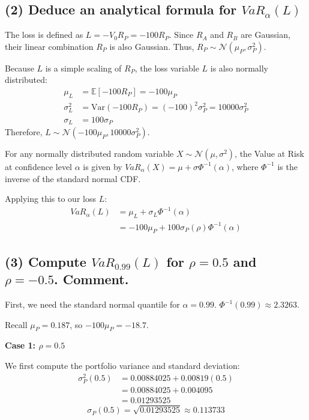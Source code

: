 \subsection*{(2) Deduce an analytical formula for $VaR_{\alpha}(L)$}

The loss is defined as $L = -V_0 R_P = -100 R_P$.
Since $R_A$ and $R_B$ are Gaussian, their linear combination $R_P$ is also Gaussian. Thus, $R_P \sim \mathcal{N}(\mu_P, \sigma_P^2)$.

Because $L$ is a simple scaling of $R_P$, the loss variable $L$ is also normally distributed:
\begin{align*}
\mu_L &= \mathbb{E}[-100 R_P] = -100 \mu_P \\
\sigma_L^2 &= \text{Var}(-100 R_P) = (-100)^2 \sigma_P^2 = 10000 \sigma_P^2 \\
\sigma_L &= 100 \sigma_P
\end{align*}
Therefore, $L \sim \mathcal{N}(-100\mu_P, 10000\sigma_P^2)$.

For any normally distributed random variable $X \sim \mathcal{N}(\mu, \sigma^2)$, the Value at Risk at confidence level $\alpha$ is given by $VaR_{\alpha}(X) = \mu + \sigma \Phi^{-1}(\alpha)$, where $\Phi^{-1}$ is the inverse of the standard normal CDF.

Applying this to our loss $L$:
\begin{align*}
VaR_{\alpha}(L) &= \mu_L + \sigma_L \Phi^{-1}(\alpha) \\
&= -100\mu_P + 100\sigma_P(\rho) \Phi^{-1}(\alpha)
\end{align*}


\subsection*{(3) Compute $VaR_{0.99}(L)$ for $\rho=0.5$ and $\rho=-0.5$. Comment.}

First, we need the standard normal quantile for $\alpha = 0.99$. 
$\Phi^{-1}(0.99) \approx 2.3263$.

Recall $\mu_P = 0.187$, so $-100\mu_P = -18.7$.

\vspace{0.3cm}
\noindent \textbf{Case 1: $\rho = 0.5$}

We first compute the portfolio variance and standard deviation:
\begin{align*}
\sigma_P^2(0.5) &= 0.00884025 + 0.00819(0.5) \\
&= 0.00884025 + 0.004095 \\
&= 0.01293525
\end{align*}
\begin{equation*}
\sigma_P(0.5) = \sqrt{0.01293525} \approx 0.113733
\end{equation*}

